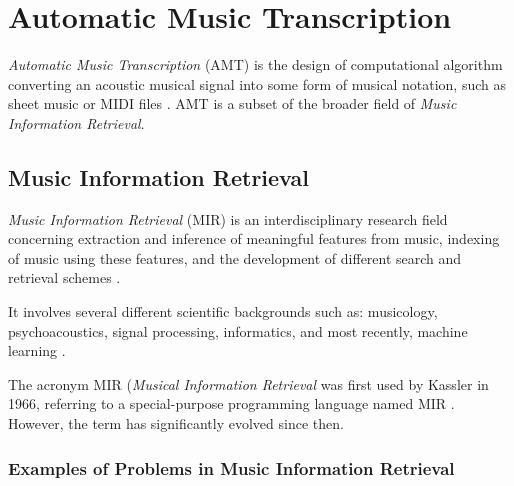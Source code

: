 \chapter{Automatic Music Transcription}\label{automatic_music_transcription}

\emph{Automatic Music Transcription} (AMT) is the design of computational algorithm converting an acoustic musical signal into some form of musical notation, such as sheet music or MIDI files \cite{Benetos2019}. AMT is a subset of the broader field of \emph{Music Information Retrieval}.

\section{Music Information Retrieval}

\emph{Music Information Retrieval} (MIR) is an interdisciplinary research field concerning extraction and inference of meaningful features from music, indexing of music using these features, and the development of different search and retrieval schemes \cite{Schedl2014}.

It involves several different scientific backgrounds such as: musicology, psychoacoustics, signal processing, informatics, and most recently, machine learning \cite{Wiki2024A}.

The acronym MIR (\emph{Musical Information Retrieval} was first used by Kassler in 1966, referring to a special-purpose programming language named MIR \cite{Kassler1966}. However, the term has significantly evolved since then.

\subsection{Examples of Problems in Music Information Retrieval}


